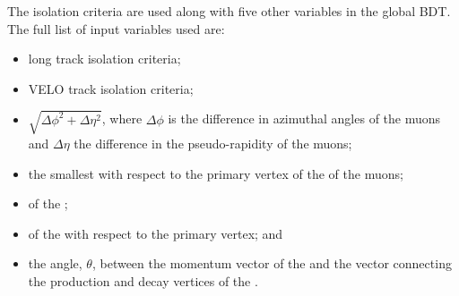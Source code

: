 

The isolation criteria are used along with five other variables in the global BDT. The full list of input variables used are:
\begin{itemize}
\item long track isolation criteria;
\item VELO track isolation criteria;
\item $\sqrt{\Delta \phi^{2} + \Delta \eta^{2}}$, where $\Delta \phi$ is the difference in azimuthal angles of the muons and $\Delta \eta$ the difference in the pseudo-rapidity of the muons;
\item the smallest \chiIP with respect to the primary vertex of the \bsmumu of the muons;
\item \chivtx of the \bs;
\item \chiIP of the \bs with respect to the primary vertex; and
\item the angle, $\theta$, between the momentum vector of the \bs and the vector connecting the production and decay vertices of the \bs.
\end{itemize}

